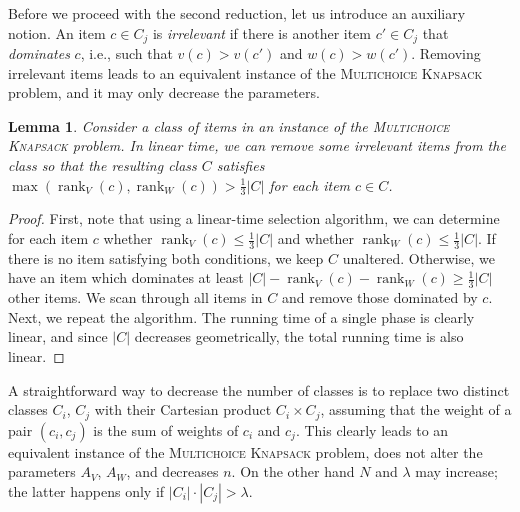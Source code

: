 \documentclass{article}
\theoremstyle{plain}
\newtheorem{lemma}[theorem]{Lemma}
\theoremstyle{definition}
\newcommand{\MK}{\textsc{Multichoice Knapsack}\xspace}
\DeclareMathOperator*{\rank}{rank}
\begin{document}
    
    Before we proceed with the second reduction,   let us introduce an auxiliary notion.
    An item $c\in C_j$ is \emph{irrelevant} if there is another item $c'\in C_j$ that \emph{dominates} $c$, i.e., 
    such that $v(c)>v(c')$ and $w(c)>w(c')$.
    Removing irrelevant items leads to an equivalent instance of the \MK problem, and it may only decrease the parameters.
    
   \begin{lemma}\label{lem:redstep}
   Consider a class of items in an instance of the \MK problem.
   In linear time, we can remove some irrelevant items from the class so that the resulting class $C$
   satisfies $\max(\rank_V(c),\rank_W(c)) > \frac13 |C|$ for each item $c\in C$.
   \end{lemma}
   \begin{proof}
   First, note that using a linear-time selection algorithm, we can determine for each item $c$
   whether $\rank_V(c)\le \frac13|C|$ and whether $\rank_W(c)\le \frac13|C|$. 
   If there is no item satisfying both conditions, we keep $C$ unaltered.
   Otherwise, we have an item which dominates at least $|C|-\rank_V(c)-\rank_W(c) \ge \frac13|C|$
   other items. We scan through all items in $C$ and remove those dominated by $c$.
   Next, we repeat the algorithm.
   The running time of a single phase is clearly linear, and since $|C|$ decreases geometrically,
   the total running time is also linear.
   \end{proof}    
   
   A straightforward way to decrease the number of classes is to replace two distinct classes $C_i$, $C_j$
   with their Cartesian product $C_i \times C_j$, 
   assuming that the weight of a pair $(c_i,c_j)$ is the sum of weights of $c_i$ and $c_j$. 
   This clearly leads to an equivalent instance of the \MK problem, does not alter the parameters $A_V$, $A_W$, and decreases $n$. 
   On the other hand $N$ and $\lambda$ may increase; the latter happens only if $|C_i| \cdot |C_j| > \lambda$.
      
\end{document}

